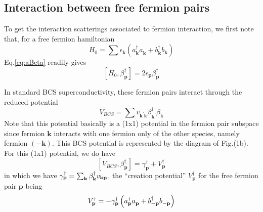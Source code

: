 \documentclass[aps,prb,superscriptaddress,showpacs,reprint,lengthcheck]{revtex4-1}
\newcommand{\vk}{\ensuremath{\mathbf{k}}}
\newcommand{\vp}{\ensuremath{\mathbf{p}}}
\begin{document}
\subsection{Interaction between free fermion pairs}

To get the interaction scatterings associated to fermion interaction, we
first note that, for a free fermion hamiltonian 
\begin{equation}  \label{eq:h0}
H_0=\sum{\epsilon_\vk\left(a^{\dagger}_{\mathbf{k} } a^{}_{\mathbf{k}
}+b^{\dagger}_{\mathbf{k} } b^{}_{\mathbf{k} }\right) }
\end{equation}
Eq.\eqref{eq:aBeta} readily gives 
\begin{equation}  \label{eq:betaH}
\left[H_0,\beta^{\dagger}_\vp\right]  =2\epsilon_\vp\beta^{\dagger}_\vp
\end{equation}

In  standard BCS superconductivity, these fermion pairs interact through the reduced potential
\begin{equation}  \label{eq:vbcs}
V_{BCS}=\sum{v_{\mathbf{k} ^{\prime}\mathbf{k} }\beta^{\dagger}_{\mathbf{k}
^{\prime}}\beta^{}_{\mathbf{k} }}
\end{equation}
Note that this potential basically is a (1x1) potential in the fermion pair subspace since fermion $\mathbf{k}$ 
interacts with one fermion only of the other
species, namely fermion $\left(-\mathbf{k} \right)$. This BCS potential is represented by the diagram of Fig.(1b).
  For this (1x1)
potential, we do have 
\begin{equation}  \label{eq:vbeta}
\left[V_{BCS},\beta^{\dagger}_\vp\right] 
=\gamma^{\dagger}_\vp+V^{\dagger}_\vp
\end{equation}
in which we have $\gamma^{\dagger}_\vp=\sum_\vk\beta^{\dagger}_\vk{}v_{%
\mathbf{k} \mathbf{p} }$, the ``creation potential'' $V^{\dagger}_\vp$ for the free fermion pair 
$\mathbf{p} $ being
\begin{equation}  \label{eq:betaV}
V^{\dagger}_\vp=-{\gamma^{\dagger}_\vp}\left(a^{\dagger}_{\mathbf{p} }a^{}_{%
\mathbf{p} }+b^{\dagger}_{-\mathbf{p} }b^{}_{-\mathbf{p} }\right) 
\end{equation}
\end{document}

